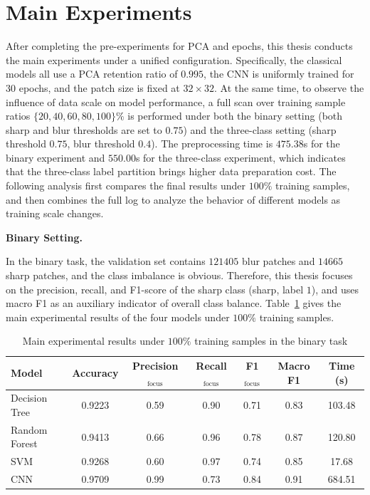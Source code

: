\section{Main Experiments}
\par After completing the pre-experiments for PCA and epochs, this thesis
conducts the main experiments under a unified configuration. Specifically, the
classical models all use a PCA retention ratio of $0.995$, the CNN is
uniformly trained for $30$ epochs, and the patch size is fixed at
$32\times 32$. At the same time, to observe the influence of data scale on
model performance, a full scan over training sample ratios
\(\{20,40,60,80,100\}\%\) is performed under both the binary setting (both
sharp and blur thresholds are set to $0.75$) and the three-class setting
(sharp threshold $0.75$, blur threshold $0.4$). The preprocessing time is
$475.38$s for the binary experiment and $550.00$s for the three-class
experiment, which indicates that the three-class label partition brings higher
data preparation cost. The following analysis first compares the final results
under $100\%$ training samples, and then combines the full log to analyze the
behavior of different models as training scale changes.

\par\medskip \noindent\textbf{Binary Setting.} \par In the binary task, the
validation set contains $121405$ blur patches and $14665$ sharp patches, and
the class imbalance is obvious. Therefore, this thesis focuses on the
precision, recall, and F1-score of the sharp class (sharp, label $1$), and
uses macro F1 as an auxiliary indicator of overall class balance.
Table~\ref{tab:main-binary-100} gives the main experimental results of the four
models under $100\%$ training samples.

\begin{table}[htbp]
    \centering
    \caption{Main experimental results under $100\%$ training samples in the binary task}
    \label{tab:main-binary-100}
    \begin{tabular}{lcccccc}
        \toprule
        Model & Accuracy & Precision$_{\mathrm{focus}}$ &
        Recall$_{\mathrm{focus}}$ & F1$_{\mathrm{focus}}$ & Macro F1 & Time (s)
        \\
        \midrule
        Decision Tree & 0.9223 & 0.59 & 0.90 & 0.71 & 0.83 & 103.48 \\
        Random Forest & 0.9413 & 0.66 & 0.96 & 0.78 & 0.87 & 120.80 \\
        SVM           & 0.9268 & 0.60 & 0.97 & 0.74 & 0.85 & 17.68  \\
        CNN           & 0.9709 & 0.99 & 0.73 & 0.84 & 0.91 & 684.51 \\
        \bottomrule
    \end{tabular}
\end{table}

